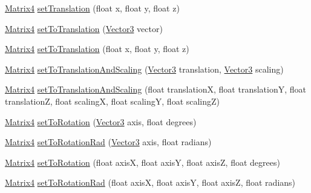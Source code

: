 \begin{DoxyCompactItemize}
\item 
\hyperlink{classairhockeyjava_1_1util_1_1_matrix4}{Matrix4} \hyperlink{classairhockeyjava_1_1util_1_1_matrix4_ac038d1aa4d8ea6ac62961ee15c9a112a}{set\+Translation} (float x, float y, float z)
\item 
\hyperlink{classairhockeyjava_1_1util_1_1_matrix4}{Matrix4} \hyperlink{classairhockeyjava_1_1util_1_1_matrix4_a87e87c6e6576562c29ae6c731cfe5b93}{set\+To\+Translation} (\hyperlink{classairhockeyjava_1_1util_1_1_vector3}{Vector3} vector)
\item 
\hyperlink{classairhockeyjava_1_1util_1_1_matrix4}{Matrix4} \hyperlink{classairhockeyjava_1_1util_1_1_matrix4_afec9182ea1aed3dd784108a959829c8b}{set\+To\+Translation} (float x, float y, float z)
\item 
\hyperlink{classairhockeyjava_1_1util_1_1_matrix4}{Matrix4} \hyperlink{classairhockeyjava_1_1util_1_1_matrix4_ad4e2b315652d2603205dbaf56ef98725}{set\+To\+Translation\+And\+Scaling} (\hyperlink{classairhockeyjava_1_1util_1_1_vector3}{Vector3} translation, \hyperlink{classairhockeyjava_1_1util_1_1_vector3}{Vector3} scaling)
\item 
\hyperlink{classairhockeyjava_1_1util_1_1_matrix4}{Matrix4} \hyperlink{classairhockeyjava_1_1util_1_1_matrix4_ac02e8e88bb3c8274dfd8fd38fa545035}{set\+To\+Translation\+And\+Scaling} (float translation\+X, float translation\+Y, float translation\+Z, float scaling\+X, float scaling\+Y, float scaling\+Z)
\item 
\hyperlink{classairhockeyjava_1_1util_1_1_matrix4}{Matrix4} \hyperlink{classairhockeyjava_1_1util_1_1_matrix4_a7d6945e8b62a958aabd076012c16df86}{set\+To\+Rotation} (\hyperlink{classairhockeyjava_1_1util_1_1_vector3}{Vector3} axis, float degrees)
\item 
\hyperlink{classairhockeyjava_1_1util_1_1_matrix4}{Matrix4} \hyperlink{classairhockeyjava_1_1util_1_1_matrix4_ae3009107af601d3e5255165e1eb5ff28}{set\+To\+Rotation\+Rad} (\hyperlink{classairhockeyjava_1_1util_1_1_vector3}{Vector3} axis, float radians)
\item 
\hyperlink{classairhockeyjava_1_1util_1_1_matrix4}{Matrix4} \hyperlink{classairhockeyjava_1_1util_1_1_matrix4_aeffd762ca64bf9874c5305a724e9d42d}{set\+To\+Rotation} (float axis\+X, float axis\+Y, float axis\+Z, float degrees)
\item 
\hyperlink{classairhockeyjava_1_1util_1_1_matrix4}{Matrix4} \hyperlink{classairhockeyjava_1_1util_1_1_matrix4_a772972b53f1e9220081638fa13e65537}{set\+To\+Rotation\+Rad} (float axis\+X, float axis\+Y, float axis\+Z, float radians)

\end{DoxyCompactItemize}
